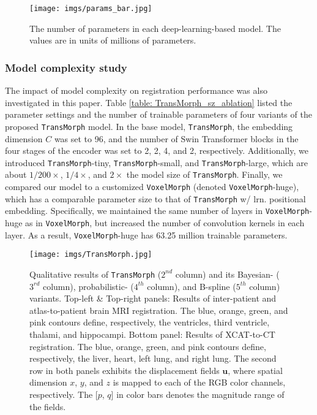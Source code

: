 \documentclass[times,twocolumn,final]{elsarticle}
\begin{document}
\begin{figure}[!t]
\centering
\texttt{[image: imgs/params\_bar.jpg]}
\caption{The number of parameters in each deep-learning-based model. The values are in units of millions of parameters.\label{fig:model_params}}
\end{figure}
\subsubsection{Model complexity study}
The impact of model complexity on registration performance was also investigated in this paper. Table \ref{table: TransMorph_sz_ablation} listed the parameter settings and the number of trainable parameters of four variants of the proposed \texttt{TransMorph} model. In the base model, \texttt{TransMorph}, the embedding dimension $C$ was set to 96, and the number of Swin Transformer blocks in the four stages of the encoder was set to 2, 2, 4, and 2, respectively. Additionally, we introduced \texttt{TransMorph}-tiny, \texttt{TransMorph}-small, and \texttt{TransMorph}-large, which are about $1/200\times$, $1/4\times$, and $2\times$ the model size of \texttt{TransMorph}. Finally, we compared our model to a customized \texttt{VoxelMorph} (denoted \texttt{VoxelMorph}-huge), which has a comparable parameter size to that of \texttt{TransMorph} w/ lrn. positional embedding. Specifically, we maintained the same number of layers in \texttt{VoxelMorph}-huge as in \texttt{VoxelMorph}, but increased the number of convolution kernels in each layer. As a result, \texttt{VoxelMorph}-huge has 63.25 million trainable parameters.
\begin{figure*}[!t]
\centering
\texttt{[image: imgs/TransMorph.jpg]}
\caption{Qualitative results of \texttt{TransMorph} ($2^{nd}$ column) and its Bayesian- ($3^{rd}$ column), probabilistic- ($4^{th}$ column), and B-spline ($5^{th}$ column) variants. Top-left \& Top-right panels: Results of inter-patient and atlas-to-patient brain MRI registration. The blue, orange, green, and pink contours define, respectively, the ventricles, third ventricle, thalami, and hippocampi. Bottom panel: Results of XCAT-to-CT registration. The blue, orange, green, and pink contours define, respectively, the liver, heart, left lung, and right lung. The second row in both panels exhibits the displacement fields $\mathbf{u}$, where spatial dimension $x$, $y$, and $z$ is mapped to each of the RGB color channels, respectively. The [$p$, $q$] in color bars denotes the magnitude range of the fields. \label{fig:brain_xcat_transmorph}}
\end{figure*}
\end{document}
